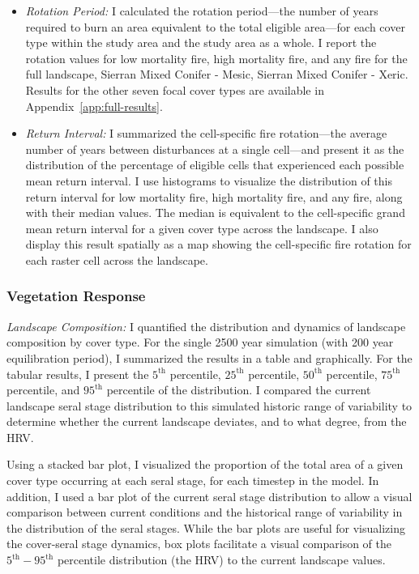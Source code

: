 \begin{itemize}
	\item \emph{Rotation Period:} I calculated the rotation period---the number of years required to burn an area equivalent to the total eligible area---for each cover type within the study area and the study area as a whole. I report the rotation values for low mortality fire, high mortality fire, and any fire for the full landscape, Sierran Mixed Conifer - Mesic, Sierran Mixed Conifer - Xeric. Results for the other seven focal cover types are available in Appendix~\ref{app:full-results}.
	\item \emph{Return Interval:} I summarized the cell-specific fire rotation---the average number of years between disturbances at a single cell---and present it as the distribution of the percentage of eligible cells that experienced each possible mean return interval. I use histograms to visualize the distribution of this return interval for low mortality fire, high mortality fire, and any fire, along with their median values. The median is equivalent to the cell-specific grand mean return interval for a given cover type across the landscape. I also display this result spatially as a map showing the cell-specific fire rotation for each raster cell across the landscape. 
\end{itemize}

\subsubsection{Vegetation Response} 

\emph{Landscape Composition:} I quantified the distribution and dynamics of landscape composition by cover type. For the single 2500 year simulation (with 200 year equilibration period), I summarized the results in a table and graphically. For the tabular results, I present the $5^{\text{th}}$ percentile, $25^{\text{th}}$ percentile, $50^{\text{th}}$ percentile, $75^{\text{th}}$ percentile, and $95^{\text{th}}$ percentile of the distribution. I compared the current landscape seral stage distribution to this simulated historic range of variability to determine whether the current landscape deviates, and to what degree, from the HRV. 

Using a stacked bar plot, I visualized the proportion of the total area of a given cover type occurring at each seral stage, for each timestep in the model. In addition, I used a bar plot of the current seral stage distribution to allow a visual comparison between current conditions and the historical range of variability in the distribution of the seral stages. While the bar plots are useful for visualizing the cover-seral stage dynamics, box plots facilitate a visual comparison of the $5^{\text{th}}-95^{\text{th}}$ percentile distribution (the HRV) to the current landscape values.

